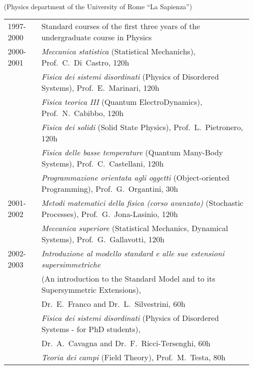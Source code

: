 \documentclass[a4paper,10pt]{article}
\begin{document}
 \\
\indent(Physics department of the University of Rome ``La Sapienza'') \\
\vskip-10pt
\begin{table}[h]
\begin{tabular}{ll}
1997-2000 & Standard courses of the first three years of the undergraduate course in Physics\\
2000-2001 & {\it Meccanica statistica} (Statistical Mechanichs), Prof.~C.~Di~Castro, 120h\\
& {\it Fisica dei sistemi disordinati} (Physics of Disordered Systems), Prof.~E.~Marinari, 120h\\
& {\it Fisica teorica III} (Quantum ElectroDynamics), Prof.~N.~Cabibbo, 120h\\
& {\it Fisica dei solidi} (Solid State Physics), Prof.~L.~Pietronero, 120h\\
& {\it Fisica delle basse temperature} (Quantum Many-Body Systems), Prof.~C.~Castellani, 120h\\
& {\it Programmazione orientata agli oggetti} (Object-oriented Programming), Prof.~G.~Organtini,
30h \\
2001-2002 & {\it Metodi matematici della fisica (corso avanzato)} (Stochastic Processes),
Prof.~G.~Jona-Lasinio, 120h \\
& {\it Meccanica superiore} (Statistical Mechanics, Dynamical Systems), 
Prof.~G.~Gallavotti, 120h \\
2002-2003 & {\it Introduzione al modello standard e alle sue estensioni supersimmetriche} \\
& \hspace{10pt} 
(An introduction to the Standard Model and to its Supersymmetric Extensions), \\
&\hspace{15pt}Dr.~E.~Franco
and Dr.~L.~Silvestrini, 60h \\
& {\it Fisica dei sistemi disordinati} (Physics of Disordered Systems - for PhD students), \\
&\hspace{15pt}Dr.~A.~Cavagna and Dr.~F.~Ricci-Tersenghi, 60h \\
& {\it Teoria dei campi} (Field Theory), Prof.~M.~Testa, 80h \\
\end{tabular}
\end{table}
\end{document}
